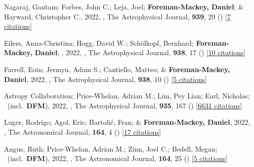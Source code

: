 \item[{\color{numcolor}\scriptsize88}] Nagaraj, Gautam; Forbes, John C.; Leja, Joel; \textbf{Foreman-Mackey, Daniel}; \& Hayward, Christopher C., 2022, , The Astrophysical Journal, \textbf{939}, 29 () [\href{https://ui.adsabs.harvard.edu/abs/2022ApJ...939...29N}{7 citations}]

\item[{\color{numcolor}\scriptsize87}] Eilers, Anna-Christina; Hogg, David W.; Sch{\"o}lkopf, Bernhard; \textbf{Foreman-Mackey, Daniel}; \etal, 2022, , The Astrophysical Journal, \textbf{938}, 17 () [\href{https://ui.adsabs.harvard.edu/abs/2022ApJ...938...17E}{10 citations}]

\item[{\color{numcolor}\scriptsize86}] Farrell, Eoin; Jermyn, Adam S.; Cantiello, Matteo; \& \textbf{Foreman-Mackey, Daniel}, 2022, , The Astrophysical Journal, \textbf{938}, 10 () [\href{https://ui.adsabs.harvard.edu/abs/2022ApJ...938...10F}{5 citations}]

\item[{\color{numcolor}\scriptsize85}] Astropy Collaboration; Price-Whelan, Adrian M.; Lim, Pey Lian; Earl, Nicholas; \etal\ (incl.\ \textbf{DFM}), 2022, , The Astrophysical Journal, \textbf{935}, 167 () [\href{https://ui.adsabs.harvard.edu/abs/2022ApJ...935..167A}{6631 citations}]

\item[{\color{numcolor}\scriptsize84}] Luger, Rodrigo; Agol, Eric; Bartoli{\'c}, Fran; \& \textbf{Foreman-Mackey, Daniel}, 2022, , The Astronomical Journal, \textbf{164}, 4 () [\href{https://ui.adsabs.harvard.edu/abs/2022AJ....164....4L}{17 citations}]

\item[{\color{numcolor}\scriptsize83}] Angus, Ruth; Price-Whelan, Adrian M.; Zinn, Joel C.; Bedell, Megan; \etal\ (incl.\ \textbf{DFM}), 2022, , The Astronomical Journal, \textbf{164}, 25 () [\href{https://ui.adsabs.harvard.edu/abs/2022AJ....164...25A}{5 citations}]

